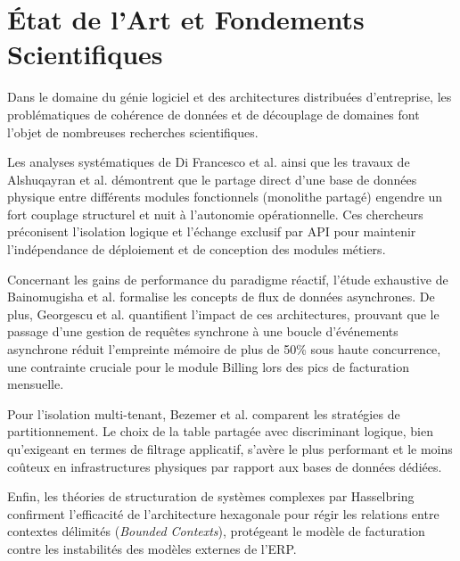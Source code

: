 \section{État de l'Art et Fondements Scientifiques}

Dans le domaine du génie logiciel et des architectures distribuées d'entreprise, les problématiques de cohérence de données et de découplage de domaines font l'objet de nombreuses recherches scientifiques.

Les analyses systématiques de Di Francesco et al. \cite{difrancesco2019architecting} ainsi que les travaux de Alshuqayran et al. \cite{alshuqayran2016systematic} démontrent que le partage direct d'une base de données physique entre différents modules fonctionnels (monolithe partagé) engendre un fort couplage structurel et nuit à l'autonomie opérationnelle. Ces chercheurs préconisent l'isolation logique et l'échange exclusif par API pour maintenir l'indépendance de déploiement et de conception des modules métiers.

Concernant les gains de performance du paradigme réactif, l'étude exhaustive de Bainomugisha et al. \cite{bainomugisha2013survey} formalise les concepts de flux de données asynchrones. De plus, Georgescu et al. \cite{georgescu2018performance} quantifient l'impact de ces architectures, prouvant que le passage d'une gestion de requêtes synchrone à une boucle d'événements asynchrone réduit l'empreinte mémoire de plus de 50\% sous haute concurrence, une contrainte cruciale pour le module Billing lors des pics de facturation mensuelle.

Pour l'isolation multi-tenant, Bezemer et al. \cite{bezemer2010multi} comparent les stratégies de partitionnement. Le choix de la table partagée avec discriminant logique, bien qu'exigeant en termes de filtrage applicatif, s'avère le plus performant et le moins coûteux en infrastructures physiques par rapport aux bases de données dédiées.

Enfin, les théories de structuration de systèmes complexes par Hasselbring \cite{hasselbring2018software} confirment l'efficacité de l'architecture hexagonale pour régir les relations entre contextes délimités (\textit{Bounded Contexts}), protégeant le modèle de facturation contre les instabilités des modèles externes de l'ERP.
